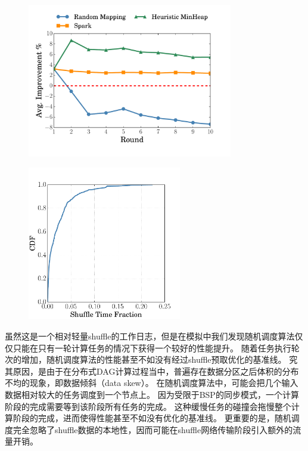 \begin{figure}[!htp]
    \centering
	\includegraphics[width=0.8\textwidth]{../../PPoPP-2018/fig/sim.pdf}
\end{figure}

\begin{figure}[!htp]
    \centering
	\includegraphics[width=0.6\textwidth]{../../PPoPP-2018/fig/reduce_cdf.pdf}
\end{figure}

虽然这是一个相对轻量shuffle的工作日志，但是在模拟中我们发现随机调度算法仅仅只能在只有一轮计算任务的情况下获得一个较好的性能提升。
随着任务执行轮次的增加，随机调度算法的性能甚至不如没有经过shuffle预取优化的基准线。
究其原因，是由于在分布式DAG计算过程当中，普遍存在数据分区之后体积的分布不均的现象，即数据倾斜（data skew）\cite{reining, gufler2012load, skewtune}。
在随机调度算法中，可能会把几个输入数据相对较大的任务调度到一个节点上。
因为受限于BSP的同步模式，一个计算阶段的完成需要等到该阶段所有任务的完成。
这种缓慢任务的碰撞会拖慢整个计算阶段的完成，进而使得性能甚至不如没有优化的基准线。
更重要的是，随机调度完全忽略了shuffle数据的本地性，因而可能在shuffle网络传输阶段引入额外的流量开销。

